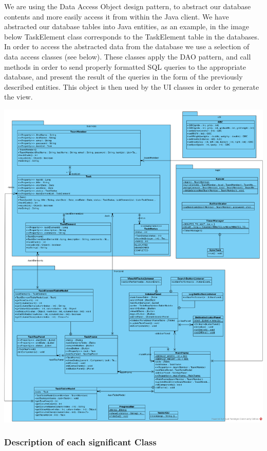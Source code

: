 \documentclass{project}
\begin{document}
  We are using the Data Access Object design pattern, to abstract our database contents and more easily access it from within the Java client.
  We have abstracted our database tables into Java entities, as an example, in the image below TaskElement class corresponds to the 
  TaskElement table in the databases.
  In order to access the abstracted data from the database we use a selection of data access classes (see below).
  These classes apply the DAO pattern, and call methods in order to send properly formatted SQL queries to the appropriate database, and present the result of the queries in the form of the previously described entities. 
  This object is then used by the UI classes in order to generate the view.
  
  \includegraphics[width=\textwidth]{images/Detailed-Design/taskerCLI_design2.png}

  \subsubsection{Description of each significant Class}
\end{document}
